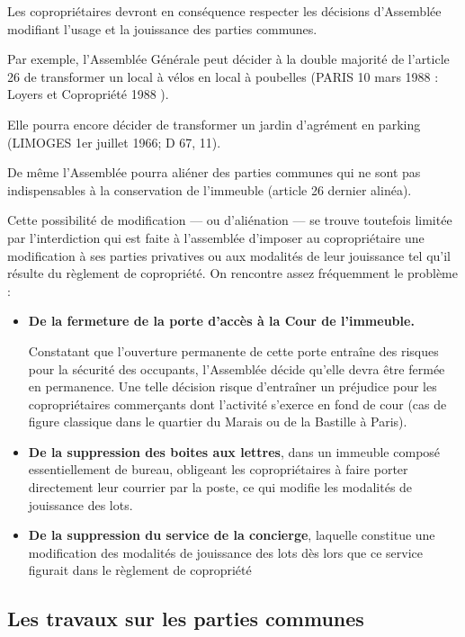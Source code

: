			Les copropriétaires devront en conséquence respecter les décisions d'Assemblée modifiant l'usage et la jouissance des parties communes.
			
			\begin{exemple}
				Par exemple, l'Assemblée Générale peut décider à la double majorité de l'article 26 de transformer un local à vélos en local à poubelles (PARIS 10 mars 1988 : Loyers et Copropriété 1988 ).
				
				Elle pourra encore décider de transformer un jardin d'agrément en parking (LIMOGES 1er juillet 1966; D 67, 11).
			\end{exemple}
			
			De même l'Assemblée pourra aliéner des parties communes qui ne sont pas indispensables à la conservation de l'immeuble (article 26 dernier alinéa).
			
			Cette possibilité de modification --- ou d'aliénation --- se trouve toutefois limitée par l'interdiction qui est faite à l'assemblée d'imposer au copropriétaire une modification à ses parties privatives ou aux modalités de leur jouissance tel qu'il résulte du règlement de copropriété. On rencontre assez fréquemment le problème :
			\begin{itemize}
				\item \textbf{De la fermeture de la porte d'accès à la Cour de l'immeuble.}
				
				Constatant que l'ouverture permanente de cette porte entraîne des risques pour la sécurité des occupants, l'Assemblée décide qu'elle devra être fermée en permanence. Une telle décision risque d'entraîner un préjudice pour les copropriétaires commerçants dont l'activité s'exerce en fond de cour (cas de figure classique dans le quartier du Marais ou de la Bastille à Paris).
				
				\item \textbf{De la suppression des boites aux lettres}, dans un immeuble composé essentiellement de bureau, obligeant les copropriétaires à faire porter directement leur courrier par la poste, ce qui modifie les modalités de jouissance des lots.
				
				\item \textbf{De la suppression du service de la concierge}, laquelle constitue une modification des modalités de jouissance des lots dès lors que ce service figurait dans le règlement de copropriété
			\end{itemize}
		
	\subsection{Les travaux sur les parties communes}\label{07_III_C}
		
